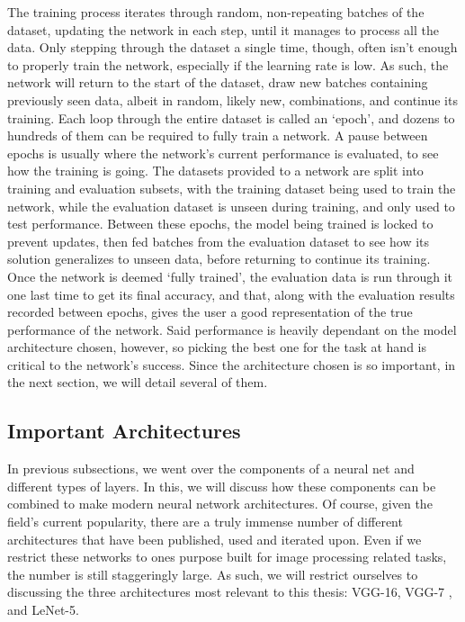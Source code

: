 \documentclass[11pt,a4paper,oldfontcommands]{memoir}
\begin{document}
The training process iterates through random, non-repeating batches of the dataset, updating the network in each step, until it manages to process all the data. Only stepping through the dataset a single time, though, often isn't enough to properly train the network, especially if the learning rate is low. As such, the network will return to the start of the dataset, draw new batches containing previously seen data, albeit in random, likely new, combinations, and continue its training. Each loop through the entire dataset is called an `epoch', and dozens to hundreds of them can be required to fully train a network. A pause between epochs is usually where the network's current performance is evaluated, to see how the training is going. The datasets provided to a network are split into training and evaluation subsets, with the training dataset being used to train the network, while the evaluation dataset is unseen during training, and only used to test performance. Between these epochs, the model being trained is locked to prevent updates, then fed batches from the evaluation dataset to see how its solution generalizes to unseen data, before returning to continue its training. Once the network is deemed `fully trained', the evaluation data is run through it one last time to get its final accuracy, and that, along with the evaluation results recorded between epochs, gives the user a good representation of the true performance of the network. Said performance is heavily dependant on the model architecture chosen, however, so picking the best one for the task at hand is critical to the network's success. Since the architecture chosen is so important, in the next section, we will detail several of them.

\subsection{Important Architectures}
\label{ss:important_architectures}
In previous subsections, we went over the components of a neural net and different types of layers. In this, we will discuss how these components can be combined to make modern neural network architectures. Of course, given the field's current popularity, there are a truly immense number of different architectures that have been published, used and iterated upon. Even if we restrict these networks to ones purpose built for image processing related tasks, the number is still staggeringly large. As such, we will restrict ourselves to discussing the three architectures most relevant to this thesis: VGG-16\cite{vgg16}, VGG-7 \cite{ternary}, and LeNet-5\cite{lenet5}.
\end{document}
